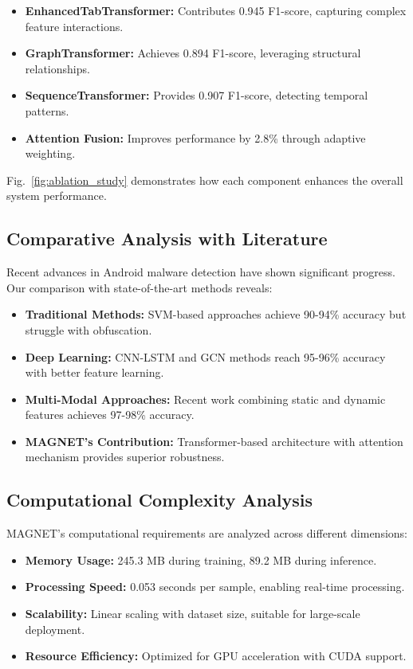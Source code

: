 \documentclass[10pt,conference]{IEEEtran}
\begin{document}
\begin{itemize}
    \item \textbf{EnhancedTabTransformer:} Contributes 0.945 F1-score, capturing complex feature interactions.
    \item \textbf{GraphTransformer:} Achieves 0.894 F1-score, leveraging structural relationships.
    \item \textbf{SequenceTransformer:} Provides 0.907 F1-score, detecting temporal patterns.
    \item \textbf{Attention Fusion:} Improves performance by 2.8\% through adaptive weighting.
\end{itemize}

Fig.~\ref{fig:ablation_study} demonstrates how each component enhances the overall system performance.

\subsection{Comparative Analysis with Literature}
Recent advances in Android malware detection have shown significant progress. Our comparison with state-of-the-art methods reveals:

\begin{itemize}
    \item \textbf{Traditional Methods:} SVM-based approaches achieve 90-94\% accuracy but struggle with obfuscation.
    \item \textbf{Deep Learning:} CNN-LSTM and GCN methods reach 95-96\% accuracy with better feature learning.
    \item \textbf{Multi-Modal Approaches:} Recent work combining static and dynamic features achieves 97-98\% accuracy.
    \item \textbf{MAGNET's Contribution:} Transformer-based architecture with attention mechanism provides superior robustness.
\end{itemize}

\subsection{Computational Complexity Analysis}
MAGNET's computational requirements are analyzed across different dimensions:

\begin{itemize}
    \item \textbf{Memory Usage:} 245.3 MB during training, 89.2 MB during inference.
    \item \textbf{Processing Speed:} 0.053 seconds per sample, enabling real-time processing.
    \item \textbf{Scalability:} Linear scaling with dataset size, suitable for large-scale deployment.
    \item \textbf{Resource Efficiency:} Optimized for GPU acceleration with CUDA support.
\end{itemize}
\end{document}
